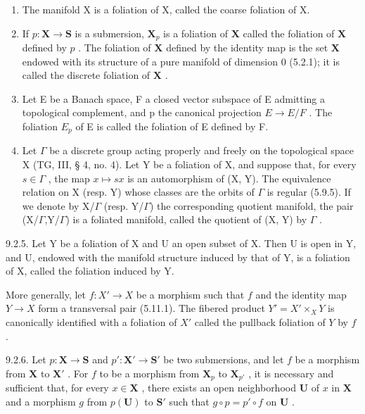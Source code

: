 \begin{enumerate}
\def\labelenumi{\alph{enumi})}
\item
  The manifold X is a foliation of X, called the coarse foliation of X.
\item
  If \(p: \mathbf{X} \to \mathbf{S}\) is a submersion, \(\mathbf{X}_p\) is a foliation of \(\mathbf{X}\) called the foliation of \(\mathbf{X}\) defined by \(p\) . The foliation of \(\mathbf{X}\) defined by the identity map is the set \(\mathbf{X}\) endowed with its structure of a pure manifold of dimension 0 (5.2.1); it is called the discrete foliation of \(\mathbf{X}\) .
\item
  Let E be a Banach space, F a closed vector subspace of E admitting a topological complement, and p the canonical projection \(E \rightarrow E/F\) . The foliation \(E_{p}\) of E is called the foliation of E defined by F.
\item
  Let \(\Gamma\) be a discrete group acting properly and freely on the topological space X (TG, III, § 4, no. 4). Let Y be a foliation of X, and suppose that, for every \(s \in \Gamma\) , the map \(x \mapsto sx\) is an automorphism of (X, Y). The equivalence relation on X (resp. Y) whose classes are the orbits of \(\Gamma\) is regular (5.9.5). If we denote by X/\(\Gamma\) (resp. Y/\(\Gamma\)) the corresponding quotient manifold, the pair (X/\(\Gamma\),Y/\(\Gamma\)) is a foliated manifold, called the quotient of (X, Y) by \(\Gamma\) .
\end{enumerate}

9.2.5. Let Y be a foliation of X and U an open subset of X. Then U is open in Y, and U, endowed with the manifold structure induced by that of Y, is a foliation of X, called the foliation induced by Y.

More generally, let \(f: X' \to X\) be a morphism such that \(f\) and the identity map \(Y \to X\) form a transversal pair (5.11.1). The fibered product \(Y' = X' \times_X Y\) is canonically identified with a foliation of \(X'\) called the pullback foliation of \(Y\) by \(f\) .

9.2.6. Let \(p: \mathbf{X} \to \mathbf{S}\) and \(p': \mathbf{X}' \to \mathbf{S}'\) be two submersions, and let \(f\) be a morphism from \(\mathbf{X}\) to \(\mathbf{X}'\) . For \(f\) to be a morphism from \(\mathbf{X}_p\) to \(\mathbf{X}_{p'}\) , it is necessary and sufficient that, for every \(x \in \mathbf{X}\) , there exists an open neighborhood \(\mathbf{U}\) of \(x\) in \(\mathbf{X}\) and a morphism \(g\) from \(p(\mathbf{U})\) to \(\mathbf{S}'\) such that \(g \circ p = p' \circ f\) on \(\mathbf{U}\) .

